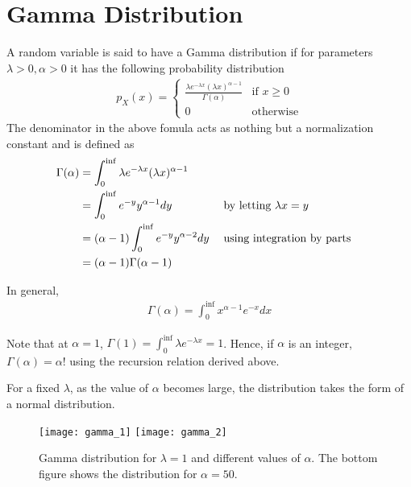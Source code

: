 \documentclass[../probability-notes.tex]{subfiles}
\begin{document}
    \section{Gamma Distribution}
    A random variable is said to have a Gamma distribution if for parameters $\lambda > 0, \alpha > 0$ it has the following probability distribution
    \begin{align*}
        p_{X}(x) = \begin{cases} 
            \frac{\lambda e^{-\lambda x} (\lambda x)^{\alpha - 1}}{\Gamma(\alpha)} &\mbox{if $x \geq 0$}\\
            0 &\mbox{otherwise}
        \end{cases}
    \end{align*}
    The denominator in the above fomula acts as nothing but a normalization constant and is defined as
    \begin{alignat*}{2}
        \Gamma (\alpha) &= \int_{0}^{\inf} \lambda e^{-\lambda x} (\lambda x)^{\alpha - 1}\\
        &= \int_{0}^{\inf} e^{-y} y^{\alpha - 1} dy &&\text{\;by letting $\lambda x = y$}\\
        &= (\alpha - 1) \int_{0}^{\inf} e^{-y} y^{\alpha - 2} dy &&\text{\;using integration by parts}\\
        &= (\alpha - 1) \Gamma (\alpha - 1)
    \end{alignat*}

    In general,
    \begin{align*}
        \Gamma(\alpha) = \int_{0}^{\inf} x^{\alpha - 1}e^{-x}dx
    \end{align*}

    Note that at $\alpha = 1$, $\Gamma (1) = \int_{0}^{\inf} \lambda e^{-\lambda x} = 1$. Hence, if $\alpha$ is an integer, $\Gamma(\alpha) = \alpha !$ using the recursion relation derived above.\newline

    For a fixed $\lambda$, as the value of $\alpha$ becomes large, the distribution takes the form of a normal distribution.

    \begin{figure}[h]
    \texttt{[image: gamma\_1]}
    \texttt{[image: gamma\_2]}
    \centering
    \caption{Gamma distribution for $\lambda = 1$ and different values of $\alpha$. The bottom figure shows the distribution for $\alpha = 50$.}
    \label{fig:gamma_1} %
    \end{figure}
\end{document}
